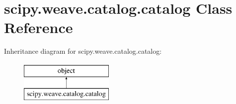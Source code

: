 \hypertarget{classscipy_1_1weave_1_1catalog_1_1catalog}{}\section{scipy.\+weave.\+catalog.\+catalog Class Reference}
\label{classscipy_1_1weave_1_1catalog_1_1catalog}
Inheritance diagram for scipy.\+weave.\+catalog.\+catalog\+:\begin{figure}[H]
\begin{center}
\leavevmode
\includegraphics[height=2.000000cm]{classscipy_1_1weave_1_1catalog_1_1catalog}
\end{center}
\end{figure}
